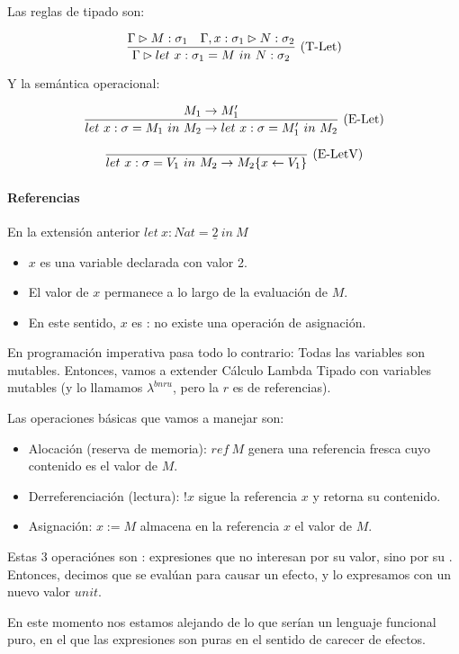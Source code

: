 Las reglas de tipado son:

\[\frac{\Gamma \rhd M : \sigma_1\quad \Gamma, x: \sigma_1 \rhd N : \sigma_2}{\Gamma \rhd let\ x : \sigma_1 = M\ in\ N : \sigma_2}\ \text{(T-Let)}\]

Y la semántica operacional:

\[\frac{M_1 \to M_1'}{let\ x : \sigma = M_1\ in\ M_2 \to let\ x : \sigma = M_1'\ in\ M_2}\ \text{(E-Let)}\]

\[\frac{}{let\ x : \sigma = V_1\ in\ M_2 \to M_2\{x \leftarrow V_1\}}\ \text{(E-LetV)}\]

\paragraph{Referencias}

En la extensión anterior $let\ x : Nat = \underline{2}\ in\ M$
\begin{itemize}
  \item $x$ es una variable declarada con valor 2.
  \item El valor de $x$ permanece  a lo largo de la evaluación de $M$.
  \item En este sentido, $x$ es : no existe una operación de asignación.
\end{itemize}

En programación imperativa pasa todo lo contrario: Todas las variables son mutables.
Entonces, vamos a extender Cálculo Lambda Tipado con variables mutables (y lo llamamos $\lambda^{bnru}$, pero la $r$ es de referencias).

Las operaciones básicas que vamos a manejar son:
\begin{itemize}
  \item Alocación (reserva de memoria): $ref\ M$ genera una referencia fresca cuyo contenido es el valor de $M$.
  \item Derreferenciación (lectura): $!x$ sigue la referencia $x$ y retorna su contenido.
  \item Asignación: $x := M$ almacena en la referencia $x$ el valor de $M$.
\end{itemize}

Estas 3 operaciónes son : expresiones que no interesan por su valor, sino por su . Entonces, decimos que se evalúan para causar un efecto, y lo expresamos con un nuevo valor $unit$.

En este momento nos estamos alejando de lo que serían un lenguaje funcional puro, en el que las expresiones son puras en el sentido de carecer de efectos.


